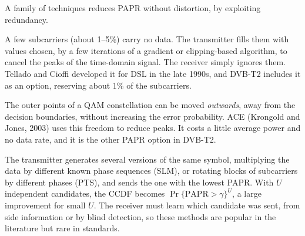 A family of techniques reduces PAPR without distortion, by exploiting redundancy.
\begin{description}[style=nextline,leftmargin=1.2em,font=\sffamily\bfseries\small\color{navy}]
\item[Tone reservation (TR).] A few subcarriers (about 1--5\%) carry no data. The transmitter fills them with
values chosen, by a few iterations of a gradient or clipping-based algorithm, to cancel the peaks of the
time-domain signal. The receiver simply ignores them. Tellado and Cioffi developed it for DSL in the late 1990s,
and DVB-T2 includes it as an option, reserving about 1\% of the subcarriers.
\item[Active constellation extension (ACE).] The outer points of a QAM constellation can be moved
\emph{outwards}, away from the decision boundaries, without increasing the error probability. ACE (Krongold and
Jones, 2003) uses this freedom to reduce peaks. It costs a little average power and no data rate, and it is the
other PAPR option in DVB-T2.
\item[Selected mapping (SLM) and partial transmit sequences (PTS).] The transmitter generates several versions
of the same symbol, multiplying the data by different known phase sequences (SLM), or rotating blocks of
subcarriers by different phases (PTS), and sends the one with the lowest PAPR. With $U$ independent candidates,
the CCDF becomes $\Pr\{\text{PAPR}>\gamma\}^U$, a large improvement for small $U$. The receiver must learn which
candidate was sent, from side information or by blind detection, so these methods are popular in the
literature but rare in standards.
\end{description}
